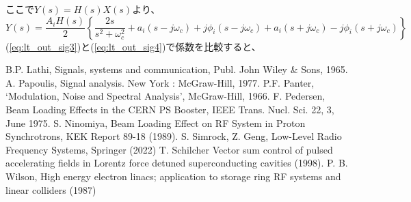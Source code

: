 \documentclass[book]{jlreq}
\begin{document}
%
ここで$Y(s) = H(s) X(s)$より、
%
\begin{equation}
    Y(s) = \frac{A_i H(s)}{2}\left\{ \frac{2s}{s^2+\omega_c^2}
    + a_i(s-j\omega_c) + j\phi_i(s-j\omega_c)
    + a_i(s+j\omega_c) - j\phi_i(s+j\omega_c) \right\}
    \label{eq:lt_out_sig4}
\end{equation}
%
(\ref{eq:lt_out_sig3})と(\ref{eq:lt_out_sig4})で係数を比較すると、
%
\begin{thebibliography}{9}
    B.P. Lathi, Signals, systems and communication, Publ. John Wiley \& Sons, 1965.
    A. Papoulis, Signal analysis. New York : McGraw-Hill, 1977.
    P.F. Panter, `Modulation, Noise and Spectral Analysis', McGraw-Hill, 1966.
    F. Pedersen, Beam Loading Effects in the CERN PS Booster, IEEE Trans. Nucl. Sci. 22, 3, June 1975.
    S. Ninomiya, Beam Loading Effect on RF System in Proton Synchrotrons, KEK Report 89-18 (1989).
    S. Simrock, Z. Geng, Low-Level Radio Frequency Systems, Springer (2022)
    T. Schilcher Vector sum control of pulsed accelerating fields in Lorentz force detuned superconducting cavities (1998).
    P. B. Wilson, High energy electron linacs; application to storage ring RF systems and linear colliders (1987)
\end{thebibliography}
%
%
\end{document}
